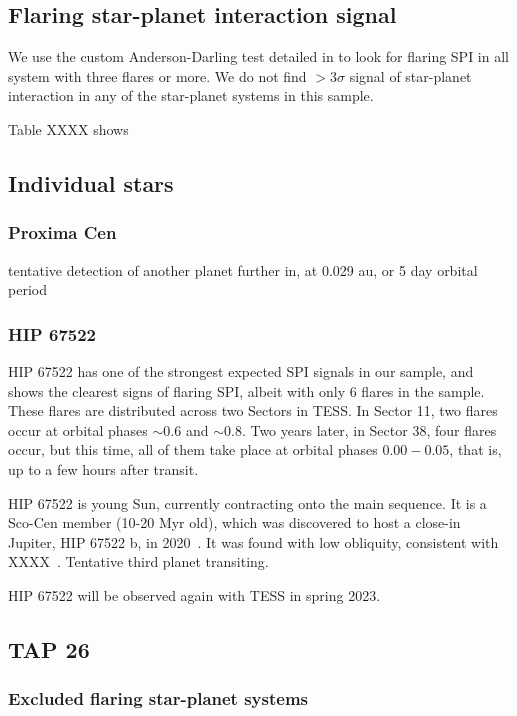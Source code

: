 \documentclass[twocolumn]{aastex631}
\begin{document}
\subsection{Flaring star-planet interaction signal}
We use the custom Anderson-Darling test detailed in \cite{ilin2022searching} to look for flaring SPI in all system with three flares or more. We do not find $>3\sigma$ signal of star-planet interaction in any of the star-planet systems in this sample.  

Table XXXX shows




\subsection{Individual stars}

\subsubsection{Proxima Cen}
tentative detection of another planet further in, at 0.029 au, or 5 day orbital period~\citep{faria2022candidate, artigau2022linebyline}

\subsubsection{HIP 67522}
HIP 67522 has one of the strongest expected SPI signals in our sample, and shows the clearest signs of flaring SPI, albeit with only 6 flares in the sample. These flares are distributed across two Sectors in TESS. In Sector 11, two flares occur at orbital phases $\sim 0.6$ and $\sim 0.8$. Two years later, in Sector 38, four flares occur, but this time, all of them take place at orbital phases $0.00-0.05$, that is, up to a few hours after transit.

HIP 67522 is young Sun, currently contracting onto the main sequence. It is a Sco-Cen member (10-20 Myr old), which was discovered to host a close-in Jupiter, HIP 67522 b, in 2020~\citep{rizzuto2020tess}. It was found with low obliquity, consistent with XXXX~\citep{heitzmann2021obliquity}. Tentative third planet transiting.

HIP 67522 will be observed again with TESS in spring 2023.

\subsection{TAP 26}

\subsubsection{Excluded flaring star-planet systems}
\end{document}
